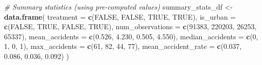 \documentclass[
]{article}
\newenvironment{Shaded}{\begin{snugshade}}{\end{snugshade}}
\newcommand{\AttributeTok}[1]{\textcolor[rgb]{0.13,0.29,0.53}{#1}}
\newcommand{\CommentTok}[1]{\textcolor[rgb]{0.56,0.35,0.01}{\textit{#1}}}
\newcommand{\ConstantTok}[1]{\textcolor[rgb]{0.56,0.35,0.01}{#1}}
\newcommand{\DecValTok}[1]{\textcolor[rgb]{0.00,0.00,0.81}{#1}}
\newcommand{\FloatTok}[1]{\textcolor[rgb]{0.00,0.00,0.81}{#1}}
\newcommand{\FunctionTok}[1]{\textcolor[rgb]{0.13,0.29,0.53}{\textbf{#1}}}
\newcommand{\NormalTok}[1]{#1}
\newcommand{\OtherTok}[1]{\textcolor[rgb]{0.56,0.35,0.01}{#1}}
\begin{document}
\begin{Shaded}
\begin{Highlighting}[]
\CommentTok{\# Summary statistics (using pre{-}computed values)}
\NormalTok{summary\_stats\_df }\OtherTok{\textless{}{-}} \FunctionTok{data.frame}\NormalTok{(}
  \AttributeTok{treatment =} \FunctionTok{c}\NormalTok{(}\ConstantTok{FALSE}\NormalTok{, }\ConstantTok{FALSE}\NormalTok{, }\ConstantTok{TRUE}\NormalTok{, }\ConstantTok{TRUE}\NormalTok{),}
  \AttributeTok{is\_urban =} \FunctionTok{c}\NormalTok{(}\ConstantTok{FALSE}\NormalTok{, }\ConstantTok{TRUE}\NormalTok{, }\ConstantTok{FALSE}\NormalTok{, }\ConstantTok{TRUE}\NormalTok{),}
  \AttributeTok{num\_observations =} \FunctionTok{c}\NormalTok{(}\DecValTok{91383}\NormalTok{, }\DecValTok{220203}\NormalTok{, }\DecValTok{26253}\NormalTok{, }\DecValTok{65337}\NormalTok{),}
  \AttributeTok{mean\_accidents =} \FunctionTok{c}\NormalTok{(}\FloatTok{0.526}\NormalTok{, }\FloatTok{4.230}\NormalTok{, }\FloatTok{0.505}\NormalTok{, }\FloatTok{4.550}\NormalTok{),}
  \AttributeTok{median\_accidents =} \FunctionTok{c}\NormalTok{(}\DecValTok{0}\NormalTok{, }\DecValTok{1}\NormalTok{, }\DecValTok{0}\NormalTok{, }\DecValTok{1}\NormalTok{),}
  \AttributeTok{max\_accidents =} \FunctionTok{c}\NormalTok{(}\DecValTok{61}\NormalTok{, }\DecValTok{82}\NormalTok{, }\DecValTok{44}\NormalTok{, }\DecValTok{77}\NormalTok{),}
  \AttributeTok{mean\_accident\_rate =} \FunctionTok{c}\NormalTok{(}\FloatTok{0.037}\NormalTok{, }\FloatTok{0.086}\NormalTok{, }\FloatTok{0.036}\NormalTok{, }\FloatTok{0.092}\NormalTok{)}
\NormalTok{)}


\end{Highlighting}
\end{Shaded}
\end{document}
